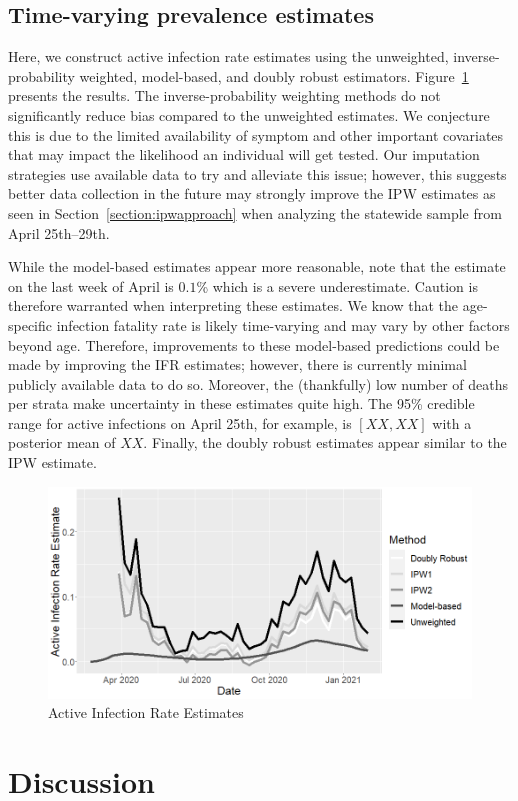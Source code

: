 \documentclass[11pt]{amsart}
\numberwithin{equation}{section}
\theoremstyle{plain}
\begin{document}
\subsection{Time-varying prevalence estimates}

Here, we construct active infection rate estimates using the unweighted, inverse-probability weighted, model-based, and doubly robust estimators.  Figure~\ref{fig:air} presents the results. The inverse-probability weighting methods do not significantly reduce bias compared to the unweighted estimates.  We conjecture this is due to the limited availability of symptom and other important covariates that may impact the likelihood an individual will get  tested. Our imputation strategies use available data to try and alleviate this issue; however, this suggests better data collection in the future may strongly improve the IPW estimates as seen in Section~\ref{section:ipwapproach} when analyzing the statewide sample from April 25th--29th.

While the model-based estimates appear more reasonable, note that the estimate on the last week of April is $0.1$\% which is a severe underestimate. Caution is therefore warranted when interpreting these estimates.  We know that the age-specific infection fatality rate is likely time-varying and may vary by other factors beyond age.  Therefore, improvements to these model-based predictions could be made by improving the IFR estimates; however, there is currently minimal publicly available data to do so.  Moreover, the (thankfully) low number of deaths per strata make uncertainty in these estimates quite high.  The 95\% credible range for active infections on April 25th, for example, is $[XX,XX]$ with a posterior mean of $XX$.  Finally, the doubly robust estimates appear similar to the IPW estimate.

\begin{figure}[!th]
\centering
\includegraphics[width=.6\linewidth]{../figs/tv_air.png}
\caption{Active Infection Rate Estimates}
\label{fig:air}
\end{figure}


\section{Discussion}
\label{section:discussion}
\end{document}
